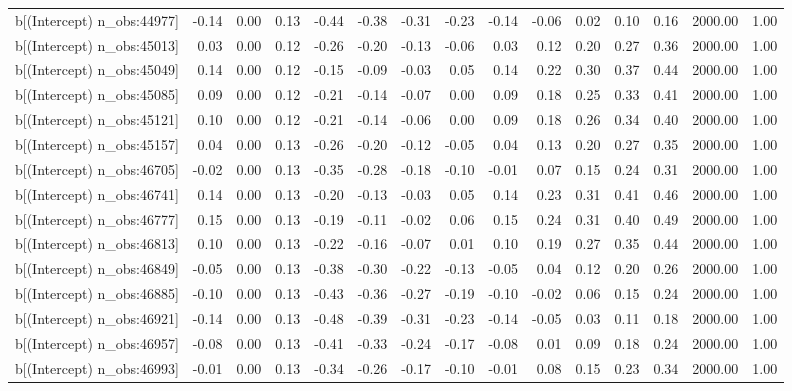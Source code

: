\begin{table}[ht]
\begin{tabular}{rrrrrrrrrrrrrrr}
  b[(Intercept) n\_obs:44977] & -0.14 & 0.00 & 0.13 & -0.44 & -0.38 & -0.31 & -0.23 & -0.14 & -0.06 & 0.02 & 0.10 & 0.16 & 2000.00 & 1.00 \\ 
  b[(Intercept) n\_obs:45013] & 0.03 & 0.00 & 0.12 & -0.26 & -0.20 & -0.13 & -0.06 & 0.03 & 0.12 & 0.20 & 0.27 & 0.36 & 2000.00 & 1.00 \\ 
  b[(Intercept) n\_obs:45049] & 0.14 & 0.00 & 0.12 & -0.15 & -0.09 & -0.03 & 0.05 & 0.14 & 0.22 & 0.30 & 0.37 & 0.44 & 2000.00 & 1.00 \\ 
  b[(Intercept) n\_obs:45085] & 0.09 & 0.00 & 0.12 & -0.21 & -0.14 & -0.07 & 0.00 & 0.09 & 0.18 & 0.25 & 0.33 & 0.41 & 2000.00 & 1.00 \\ 
  b[(Intercept) n\_obs:45121] & 0.10 & 0.00 & 0.12 & -0.21 & -0.14 & -0.06 & 0.00 & 0.09 & 0.18 & 0.26 & 0.34 & 0.40 & 2000.00 & 1.00 \\ 
  b[(Intercept) n\_obs:45157] & 0.04 & 0.00 & 0.13 & -0.26 & -0.20 & -0.12 & -0.05 & 0.04 & 0.13 & 0.20 & 0.27 & 0.35 & 2000.00 & 1.00 \\ 
  b[(Intercept) n\_obs:46705] & -0.02 & 0.00 & 0.13 & -0.35 & -0.28 & -0.18 & -0.10 & -0.01 & 0.07 & 0.15 & 0.24 & 0.31 & 2000.00 & 1.00 \\ 
  b[(Intercept) n\_obs:46741] & 0.14 & 0.00 & 0.13 & -0.20 & -0.13 & -0.03 & 0.05 & 0.14 & 0.23 & 0.31 & 0.41 & 0.46 & 2000.00 & 1.00 \\ 
  b[(Intercept) n\_obs:46777] & 0.15 & 0.00 & 0.13 & -0.19 & -0.11 & -0.02 & 0.06 & 0.15 & 0.24 & 0.31 & 0.40 & 0.49 & 2000.00 & 1.00 \\ 
  b[(Intercept) n\_obs:46813] & 0.10 & 0.00 & 0.13 & -0.22 & -0.16 & -0.07 & 0.01 & 0.10 & 0.19 & 0.27 & 0.35 & 0.44 & 2000.00 & 1.00 \\ 
  b[(Intercept) n\_obs:46849] & -0.05 & 0.00 & 0.13 & -0.38 & -0.30 & -0.22 & -0.13 & -0.05 & 0.04 & 0.12 & 0.20 & 0.26 & 2000.00 & 1.00 \\ 
  b[(Intercept) n\_obs:46885] & -0.10 & 0.00 & 0.13 & -0.43 & -0.36 & -0.27 & -0.19 & -0.10 & -0.02 & 0.06 & 0.15 & 0.24 & 2000.00 & 1.00 \\ 
  b[(Intercept) n\_obs:46921] & -0.14 & 0.00 & 0.13 & -0.48 & -0.39 & -0.31 & -0.23 & -0.14 & -0.05 & 0.03 & 0.11 & 0.18 & 2000.00 & 1.00 \\ 
  b[(Intercept) n\_obs:46957] & -0.08 & 0.00 & 0.13 & -0.41 & -0.33 & -0.24 & -0.17 & -0.08 & 0.01 & 0.09 & 0.18 & 0.24 & 2000.00 & 1.00 \\ 
  b[(Intercept) n\_obs:46993] & -0.01 & 0.00 & 0.13 & -0.34 & -0.26 & -0.17 & -0.10 & -0.01 & 0.08 & 0.15 & 0.23 & 0.34 & 2000.00 & 1.00 \\ 

\end{tabular}
\end{table}
